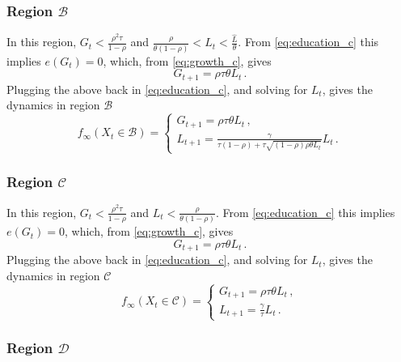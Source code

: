 \documentclass[a4paper,fleqn]{cas-sc}
\begin{document}
\subsubsection{Region $\mathcal{B}$}\label{appenix_C_2}

In this region, $G_t<\frac{\rho^2\tau}{1-\rho}$ and $\frac{\rho}{\theta(1-\rho)}<L_t<\frac{\hat{L}}{\theta}$. 
From \eqref{eq:education_c} this implies $e(G_t) = 0$, which, from \eqref{eq:growth_c}, gives
%
\begin{equation*}
    G_{t+1} = \rho\tau\theta L_t\,.
\end{equation*}
%
Plugging the above back in \eqref{eq:education_c}, and solving for $L_t$, gives the dynamics in region $\mathcal B$
%
\begin{equation}\label{eq:dynamics_in_B}
    f_{\infty}(X_t\in\mathcal B) = \begin{cases}
                            G_{t+1} = \rho\tau\theta L_t\,, \\[8pt]
                            L_{t+1} = \frac{\gamma}{\tau(1-\rho) + \tau\sqrt{(1-\rho)\rho\theta L_t}} L_t\,.
                      \end{cases}
\end{equation}

\subsubsection{Region $\mathcal{C}$}\label{appenix_C_3}

In this region, $G_t<\frac{\rho^2\tau}{1-\rho}$ and $L_t<\frac{\rho}{\theta(1-\rho)}$. 
From \eqref{eq:education_c} this implies $e(G_t) = 0$, which, from \eqref{eq:growth_c}, gives
%
\begin{equation*}
    G_{t+1} = \rho\tau\theta L_t\,.
\end{equation*}
%
Plugging the above back in \eqref{eq:education_c}, and solving for $L_t$, gives the dynamics in region $\mathcal C$
%
\begin{equation}\label{eq:dynamics_in_C}
    f_{\infty}(X_t\in\mathcal C) = \begin{cases}
                            G_{t+1} = \rho\tau\theta L_t\,, \\[8pt]
                            L_{t+1} = \frac{\gamma}{\tau} L_t\,.
                      \end{cases}
\end{equation}

\subsubsection{Region $\mathcal{D}$}\label{appenix_C_4}
\end{document}
